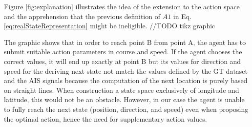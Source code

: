 Figure \ref{fig:explanation} illustrates the idea of the extension to the action space and the apprehension that the previous definition of $A1$ in Eq. \ref{eq:realStateRepresentation} might be ineligible. 
//TODO tikz graphic

The graphic shows that in order to reach point B from point A, the agent has to submit suitable action parameters in course and speed. If the agent chooses the correct values, it will end up exactly at point B but its values for direction and speed for the deriving next state not match the values defined by the GT dataset and the AIS signals because the computation of the next location is purely based on straight lines. When construction a state space exclusively of longitude and latitude, this would not be an obstacle. However, in our case the agent is unable to fully reach the next state (position, direction, and speed) even when proposing the optimal action, hence the need for supplementary action values.